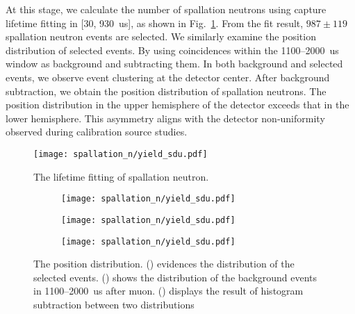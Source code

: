 At this stage, we calculate the number of spallation neutrons using capture lifetime fitting in [30, \SI{930}{us}], as shown in Fig.~\ref{fig:lifeSPNSDU}. From the fit result, $987\pm 119$ spallation neutron events are selected. We similarly examine the position distribution of selected events. By using coincidences within the 1100--\SI{2000}{us} window as background and subtracting them. In both background and selected events, we observe event clustering at the detector center. After background subtraction, we obtain the position distribution of spallation neutrons. The position distribution in the upper hemisphere of the detector exceeds that in the lower hemisphere. This asymmetry aligns with the detector non-uniformity observed during calibration source studies.
\begin{figure}[htbp]
	\centering
	\texttt{[image: spallation\_n/yield\_sdu.pdf]}
	\caption{The lifetime fitting of spallation neutron.}
	\label{fig:lifeSPNSDU}
\end{figure}

\begin{figure}[htbp]
	\centering
	\begin{subfigure}{0.5\textwidth}
		\centering
		\texttt{[image: spallation\_n/yield\_sdu.pdf]}
		\caption{}
		\label{fig:coinPOS_sig}
	\end{subfigure}%
	\begin{subfigure}{0.5\textwidth}
		\centering
		\texttt{[image: spallation\_n/yield\_sdu.pdf]}
		\caption{}
		\label{fig:coinPOS_bkg}
	\end{subfigure}
	\begin{subfigure}{0.5\textwidth}
		\centering
		\texttt{[image: spallation\_n/yield\_sdu.pdf]}
		\caption{}
		\label{fig:coinPOS_ex}
	\end{subfigure}
	\caption{The position distribution. () evidences the distribution of the selected events. () shows the distribution of the background events in 1100--\SI{2000}{us} after muon. () displays the result of histogram subtraction between two distributions}
	\label{fig:coinPOS}
\end{figure}

